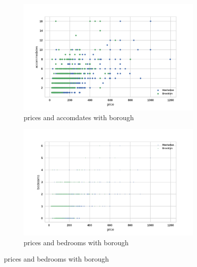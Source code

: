 \documentclass[12pt]{article}
\begin{document}
\begin{figure}
    \centering
    \begin{subfigure}[b]{0.45\textwidth}
        \includegraphics[width=\textwidth]{images/pair-acc-price.png}
        \caption{prices and accomdates with borough}
        \label{fig:pair-acc-price}
    \end{subfigure}
    \begin{subfigure}[b]{0.45\textwidth}
        \includegraphics[width=\textwidth]{images/pair-bedrooms-price.png}
        \caption{prices and bedrooms with borough}
        \label{fig:pair-bedrooms-price}
    \end{subfigure}
    

\end{figure}
\end{document}
